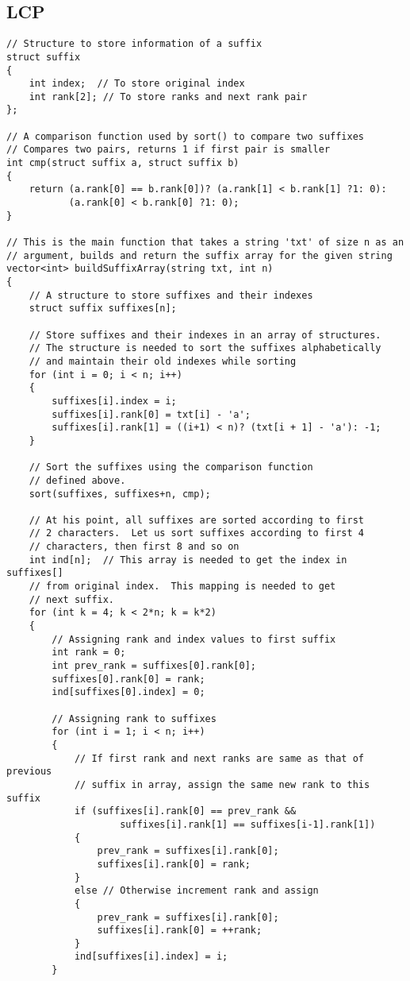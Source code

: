 \documentclass{article}
\begin{document}
\subsection{LCP}

\begin{lstlisting}
// Structure to store information of a suffix
struct suffix
{
    int index;  // To store original index
    int rank[2]; // To store ranks and next rank pair
};
 
// A comparison function used by sort() to compare two suffixes
// Compares two pairs, returns 1 if first pair is smaller
int cmp(struct suffix a, struct suffix b)
{
    return (a.rank[0] == b.rank[0])? (a.rank[1] < b.rank[1] ?1: 0):
           (a.rank[0] < b.rank[0] ?1: 0);
}
 
// This is the main function that takes a string 'txt' of size n as an
// argument, builds and return the suffix array for the given string
vector<int> buildSuffixArray(string txt, int n)
{
    // A structure to store suffixes and their indexes
    struct suffix suffixes[n];
 
    // Store suffixes and their indexes in an array of structures.
    // The structure is needed to sort the suffixes alphabetically
    // and maintain their old indexes while sorting
    for (int i = 0; i < n; i++)
    {
        suffixes[i].index = i;
        suffixes[i].rank[0] = txt[i] - 'a';
        suffixes[i].rank[1] = ((i+1) < n)? (txt[i + 1] - 'a'): -1;
    }
 
    // Sort the suffixes using the comparison function
    // defined above.
    sort(suffixes, suffixes+n, cmp);
 
    // At his point, all suffixes are sorted according to first
    // 2 characters.  Let us sort suffixes according to first 4
    // characters, then first 8 and so on
    int ind[n];  // This array is needed to get the index in suffixes[]
    // from original index.  This mapping is needed to get
    // next suffix.
    for (int k = 4; k < 2*n; k = k*2)
    {
        // Assigning rank and index values to first suffix
        int rank = 0;
        int prev_rank = suffixes[0].rank[0];
        suffixes[0].rank[0] = rank;
        ind[suffixes[0].index] = 0;
 
        // Assigning rank to suffixes
        for (int i = 1; i < n; i++)
        {
            // If first rank and next ranks are same as that of previous
            // suffix in array, assign the same new rank to this suffix
            if (suffixes[i].rank[0] == prev_rank &&
                    suffixes[i].rank[1] == suffixes[i-1].rank[1])
            {
                prev_rank = suffixes[i].rank[0];
                suffixes[i].rank[0] = rank;
            }
            else // Otherwise increment rank and assign
            {
                prev_rank = suffixes[i].rank[0];
                suffixes[i].rank[0] = ++rank;
            }
            ind[suffixes[i].index] = i;
        }
 

\end{lstlisting}
\end{document}
